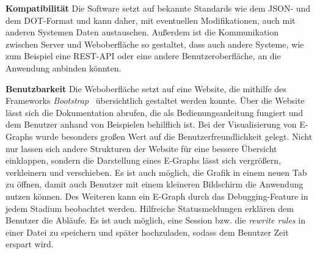 \noindent\textbf{Kompatibilität} Die Software setzt auf bekannte Standards wie dem JSON- und dem DOT-Format und kann daher, mit eventuellen Modifikationen, auch mit anderen Systemen Daten austauschen.
Außerdem ist die Kommunikation zwischen Server und Weboberfläche so gestaltet, dass auch andere Systeme, wie zum Beispiel eine REST-API oder eine andere Benutzeroberfläche, an die Anwendung anbinden könnten.

\noindent\textbf{Benutzbarkeit} Die Weboberfläche setzt auf eine Website, die mithilfe des Frameworks \textit{Bootstrap}~\cite{bootstrap} übersichtlich gestaltet werden konnte.
Über die Website lässt sich die Dokumentation abrufen, die als Bedienungsanleitung fungiert und dem Benutzer anhand von Beispielen behilflich ist.
Bei der Visualisierung von E-Graphs wurde besonders großen Wert auf die Benutzerfreundlichkeit gelegt. Nicht nur lassen sich andere Strukturen der Website für eine bessere Übersicht 
einklappen, sondern die Darstellung eines E-Graphs lässt sich vergrößern, verkleinern und verschieben. Es ist auch möglich, die Grafik in einem neuen Tab zu öffnen, damit auch Benutzer
mit einem kleineren Bildschirm die Anwendung nutzen können.
Des Weiteren kann ein E-Graph durch das Debugging-Feature in jedem Stadium beobachtet werden. Hilfreiche Statusmeldungen erklären dem Benutzer die Abläufe.
Es ist auch möglich, eine Session bzw. die \textit{rewrite rules} in einer Datei zu speichern und später hochzuladen, sodass dem Benutzer Zeit erspart wird.
